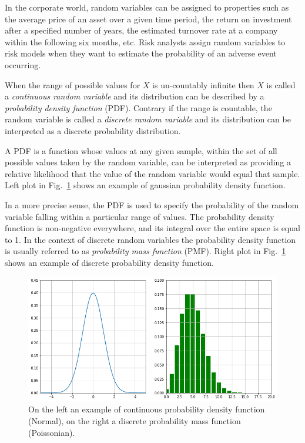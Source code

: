 In the corporate world, random variables can be assigned to properties such as the average price of an 
asset over a given time period, the return on investment after a specified number of years, the estimated 
turnover rate at a company within the following six months, etc. Risk analysts assign random variables 
to risk models when they want to estimate the probability of an adverse event occurring. 

When the range of possible values for \(X\) is un-countably infinite then \(X\) 
is called a \emph{continuous random variable} and its distribution can be described by a
\emph{probability density function} (PDF).
Contrary if the range is countable, the random
variable is called a \emph{discrete random variable} and its
distribution can be interpreted as a discrete probability distribution.

A PDF is a function whose values at any given sample,
within the set of all possible values taken by the random variable, 
can be interpreted as providing a relative likelihood that the value of the random variable
would equal that sample. Left plot in Fig.~\ref{fig:pdf_pmf} shows an example of gaussian probability density function.

In a more precise sense, the PDF is used to specify the probability of the random variable falling 
within a particular range of values.
The probability density function is non-negative everywhere, and its integral over the entire space 
is equal to 1.
In the context of discrete random variables the probability density function is usually referred 
to as \emph{probability mass function} (PMF).
Right plot in Fig.~\ref{fig:pdf_pmf} shows an example of discrete probability density function.

\begin{figure}[htb]
	\centering
	\includegraphics[width=1.\textwidth]{figures/pdf_pmf.png}
	\caption{On the left an example of continuous probability density function (Normal), on the right a discrete probability mass function (Poissonian).}
	\label{fig:pdf_pmf}
\end{figure}

